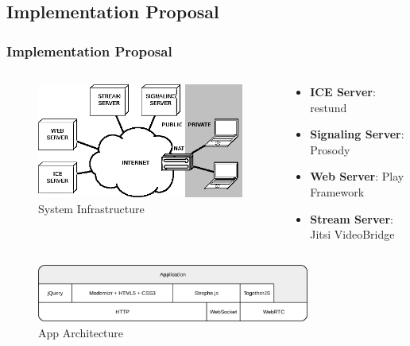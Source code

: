 \documentclass[t]{beamer}
\begin{document}
\subsection{Implementation Proposal}

		\begin{frame}[c]
		\frametitle{Implementation Proposal}


\begin{columns}[c]
\begin{column}{.4\textwidth}
		\begin{figure}[H]
			\includegraphics[width=\textwidth]{figures/arch.png}
			\caption{System Infrastructure}
		\end{figure}
\end{column}
\begin{column}{.6\textwidth}

\begin{itemize}
\small
		\item \textbf{ICE Server}: restund
		\vfill
		\item \textbf{Signaling Server}: Prosody
		\vfill
		\item \textbf{Web Server}: Play Framework
		\vfill
		\item \textbf{Stream Server}: Jitsi VideoBridge
		\end{itemize}

\end{column}
\end{columns}



{
		\centering
		\begin{figure}[H]
			\includegraphics[width=0.8\textwidth]{figures/apparch.png}
			\caption{App Architecture}
		\end{figure}
}

		\end{frame}
\end{document}
